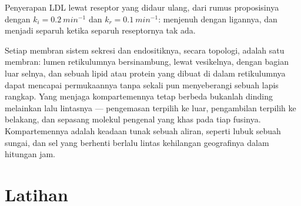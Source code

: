 \begin{omfigure}

{\small Penyerapan LDL lewat reseptor yang didaur ulang, dari rumus
proposisinya dengan $k_{i} = \qty{0.2}{min^{-1}}$ dan $k_{r} =
\qty{0.1}{min^{-1}}$: menjenuh dengan ligannya, dan menjadi separuh ketika
separuh reseptornya tak ada.}
\end{omfigure}

\begin{remark}\label{rem:b3:membrane-traffic:one-membrane}
Setiap membran sistem sekresi dan endositiknya, secara topologi, adalah satu
membran: lumen retikulumnya bersinambung, lewat vesikelnya, dengan bagian luar
selnya, dan sebuah lipid atau protein yang dibuat di dalam retikulumnya dapat
mencapai permukaannya tanpa sekali pun menyeberangi sebuah lapis rangkap.
Yang menjaga kompartemennya tetap berbeda bukanlah dinding melainkan lalu
lintasnya --- pengemasan terpilih ke luar, pengambilan terpilih ke belakang,
dan sepasang molekul pengenal yang khas pada tiap fusinya. Kompartemennya
adalah keadaan tunak sebuah aliran, seperti lubuk sebuah sungai, dan sel yang
berhenti berlalu lintas kehilangan geografinya dalam hitungan jam.
\end{remark}

\section{Latihan}

